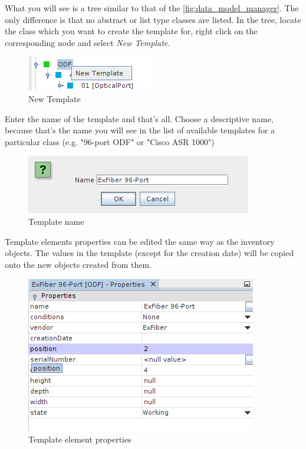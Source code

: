\documentclass[a4paper]{article}
\begin{document}
	What you will see is a tree similar to that of the \ref{fig:data_model_manager}. The only difference is that no abstract or list type classes are listed. In the tree, locate the class which you want to create the template for, right click on the corresponding node and select \textit{New Template}.
	
	\begin{figure}[h!]
		\centering
		\includegraphics[width=0.4\linewidth]{img/template_manager_new_template.png}
		\caption{New Template}
		\label{fig:template_manager_new_template}
	\end{figure}
	
	Enter the name of the template and that's all. Choose a descriptive name, because that's the name you will see in the list of available templates for a particular class (e.g. "96-port ODF" or "Cisco ASR 1000")
	
	\begin{figure}[h!]
		\centering
		\includegraphics[width=0.6\linewidth]{img/template_manager_template_name.png}
		\caption{Template name}
		\label{fig:template_manager_name}
	\end{figure}
	
	Template elements properties can be edited the same way as the inventory objects. The values in the template (except for the creation date) will be copied onto the new objects created from them.
	\newpage
	\begin{figure}[h!]
		\centering
		\includegraphics[width=0.6\linewidth]{img/template_manager_template_properties.png}
		\caption{Template element properties}
		\label{fig:template_manager_template_properties}
	\end{figure}
	
\end{document}
